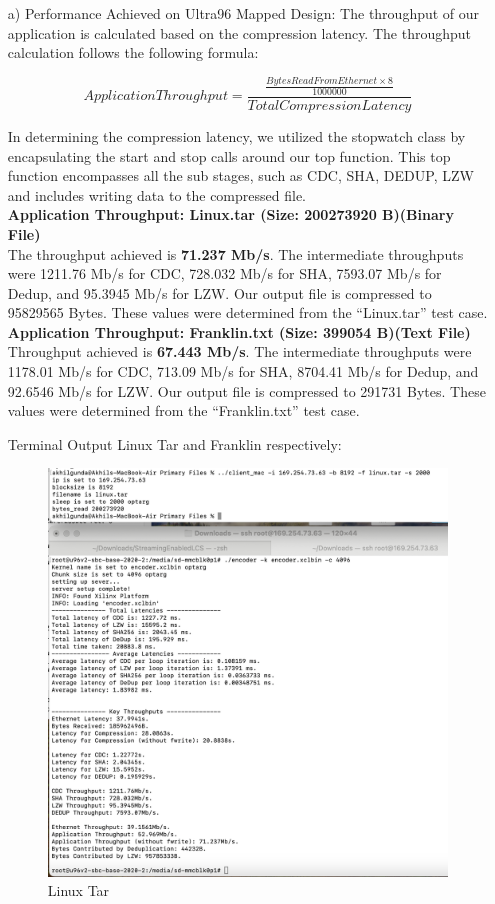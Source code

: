 \documentclass[../main.tex]{subfiles}
\begin{document}
\begin{enumerate}
    \item[a)] Performance Achieved on Ultra96 Mapped Design: The throughput of our application is calculated based on the compression latency. The throughput calculation follows the following formula:
        
        $$
        ApplicationThroughput = \frac{\frac{BytesReadFromEthernet \times 8}{1000000}}{TotalCompressionLatency}
        $$
        
        \noindent In determining the compression latency, we utilized the stopwatch class by encapsulating the start and stop calls around our top function. This top function encompasses all the sub stages, such as CDC, SHA, DEDUP, LZW and includes writing data to the compressed file.  \\
        
        \noindent \textbf{Application Throughput: Linux.tar (Size: 200273920 B)(Binary File)} \\
        The throughput achieved is \textbf{71.237 Mb/s}. The intermediate throughputs were 1211.76 Mb/s for CDC, 728.032 Mb/s for SHA, 7593.07 Mb/s for Dedup, and 95.3945 Mb/s for LZW. Our output file is compressed to 95829565 Bytes. These values were determined from the “Linux.tar” test case. \\
        
        \noindent \textbf{Application Throughput: Franklin.txt (Size: 399054 B)(Text File)} \\
        Throughput achieved is \textbf{67.443 Mb/s}. The intermediate throughputs were 1178.01 Mb/s for CDC, 713.09 Mb/s for SHA, 8704.41 Mb/s for Dedup, and 92.6546 Mb/s for LZW. Our output file is compressed to 291731 Bytes. These values were determined from the “Franklin.txt” test case.  \\
        
        \newpage
        
        Terminal Output Linux Tar and Franklin respectively:
        \begin{figure}[H]
            \centering
            \includegraphics[width=0.63\linewidth]{Images/image9.png}
            \caption{Linux Tar}
            \label{fig:linux_tar}
        \end{figure}
        

\end{enumerate}
\end{document}
